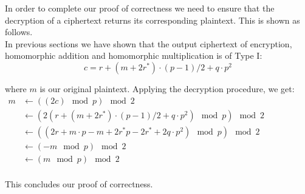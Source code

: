 \documentclass[../../main.tex]{subfiles}
\begin{document}
\noindent In order to complete our proof of correctness we need to ensure that the decryption of a ciphertext returns its corresponding plaintext. This is shown as follows. \\

\noindent In previous sections we have shown that the output ciphertext of encryption, homomorphic addition and homomorphic multiplication is of Type I:
\begin{equation*}
    c = r + (m + 2 r^*) \cdot (p-1)/2 + q \cdot p^2 
\end{equation*}

\noindent where $m$ is our original plaintext. Applying the decryption procedure, we get:
\begin{equation*}
    \begin{split}
        m &\leftarrow ((2c) \mod p) \mod 2 \\
          &\leftarrow (2(r + (m + 2r^*) \cdot (p-1)/2 + q \cdot p^2) \mod p) \mod 2 \qquad \qquad \qquad \qquad \\
          &\leftarrow ((2r + m \cdot p - m + 2r^*p - 2r^* + 2 q\cdot p^2) \mod p) \mod 2 \\
          &\leftarrow (-m \mod p) \mod 2 \\
          &\leftarrow (m \mod p) \mod 2 \\
    \end{split}
\end{equation*}

\noindent This concludes our proof of correctness.
\end{document}
